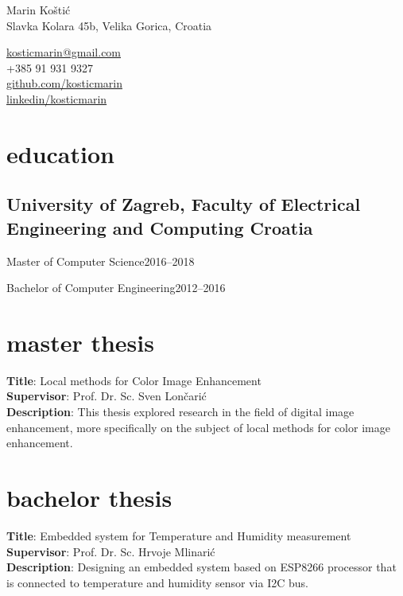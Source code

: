 \documentclass[a4paper]{article}
\makeatletter
\newlength{\tablewidth}
\newenvironment{period_empty}[2]{%
\newcommand{\sarma}{#2}%
\setlength{\tablewidth}{\linewidth}
\addtolength{\tablewidth}{-2\tabcolsep}
\begin{tabular}{@{}p{0.75\tablewidth}>{\raggedleft\arraybackslash}p{0.25\tablewidth}@{}}%
#1
}{& \sarma \end{tabular}}
\makeatother
\begin{document}
\fontfamily{\sfdefault}
\selectfont

\begin{minipage}{.5\textwidth}
\LARGE{Marin Koštić}\\
\normalsize{Slavka Kolara 45b, Velika Gorica, Croatia}
\end{minipage}%
\begin{minipage}{.5\textwidth}
\raggedleft
\href{mailto:kosticmarin@gmail.com}{kosticmarin@gmail.com}\\
+385 91 931 9327 \\
\href{https://github.com/kosticmarin}{github.com/kosticmarin}\\
\href{https://www.linkedin.com/in/marin-koštić-495949155}{linkedin/kosticmarin}
\end{minipage}

\vspace{1em}


\section{education}
\subsection{University of Zagreb, Faculty of Electrical Engineering and Computing \hspace*{\fill}Croatia}
\begin{period_empty}{Master of Computer Science}{2016--2018} 
\end{period_empty}
\begin{period_empty}{Bachelor of Computer Engineering}{2012--2016}
\end{period_empty}

\section{master thesis}
\textbf{Title}: Local methods for Color Image Enhancement\\
\textbf{Supervisor}: Prof. Dr. Sc. Sven Lončarić\\
\textbf{Description}: This thesis explored research in the field of digital image enhancement, more specifically on the subject of local methods for color image enhancement.

\section{bachelor thesis}
\textbf{Title}: Embedded system for Temperature and Humidity measurement\\
\textbf{Supervisor}: Prof. Dr. Sc. Hrvoje Mlinarić\\
\textbf{Description}: Designing an embedded system based on ESP8266 processor that is connected
to temperature and humidity sensor via I2C bus.
\end{document}
